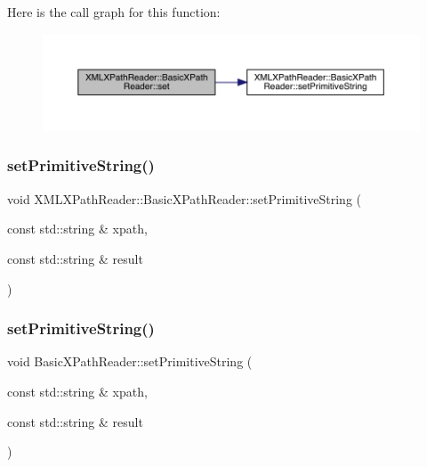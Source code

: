 Here is the call graph for this function\+:
\nopagebreak
\begin{figure}[H]
\begin{center}
\leavevmode
\includegraphics[width=350pt]{d6/dbf/classXMLXPathReader_1_1BasicXPathReader_a4cf7407f107bf4f307b70af4cccbd30e_cgraph}
\end{center}
\end{figure}
\mbox{\label{classXMLXPathReader_1_1BasicXPathReader_a76d2a9f9bc292c92558619e47b85dd4c}} 
\subsubsection{\texorpdfstring{setPrimitiveString()}{setPrimitiveString()}\hspace{0.1cm}{\footnotesize\ttfamily [1/2]}}
{\footnotesize\ttfamily void X\+M\+L\+X\+Path\+Reader\+::\+Basic\+X\+Path\+Reader\+::set\+Primitive\+String (\begin{DoxyParamCaption}\item[{const std\+::string \&}]{xpath,  }\item[{const std\+::string \&}]{result }\end{DoxyParamCaption})}

\mbox{\label{classXMLXPathReader_1_1BasicXPathReader_a1cc6aa3e855c995ebd874c475a68a076}} 
\subsubsection{\texorpdfstring{setPrimitiveString()}{setPrimitiveString()}\hspace{0.1cm}{\footnotesize\ttfamily [2/2]}}
{\footnotesize\ttfamily void Basic\+X\+Path\+Reader\+::set\+Primitive\+String (\begin{DoxyParamCaption}\item[{const std\+::string \&}]{xpath,  }\item[{const std\+::string \&}]{result }\end{DoxyParamCaption})}

